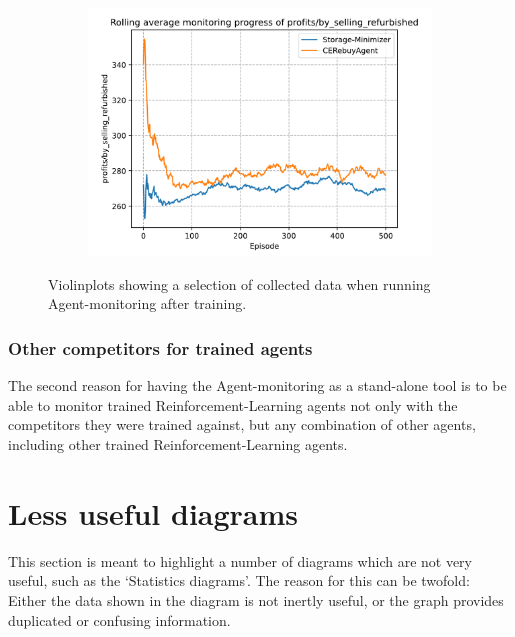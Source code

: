 \begin{figure}[t]
	\begin{subfigure}{0.33\textwidth}
		\centering
		\includegraphics[width = \textwidth]{images/experiments/rulebased/RuleBasedMonitoringProfitsRefurbished.pdf}\\
		\label{fig:RulebasedAgentMonitoring3}
	\end{subfigure}
	\caption{Violinplots showing a selection of collected data when running Agent-monitoring after training.}\label{fig:RulebasedAgentMonitoring}
\end{figure}

\subsubsection*{Other competitors for trained agents}

The second reason for having the Agent-monitoring as a stand-alone tool is to be able to monitor trained Reinforcement-Learning agents not only with the competitors they were trained against, but any combination of other agents, including other trained Reinforcement-Learning agents.

\section*{Less useful diagrams}\label{sec:UselessDiagrams}

This section is meant to highlight a number of diagrams which are not very useful, such as the `Statistics diagrams'. The reason for this can be twofold: Either the data shown in the diagram is not inertly useful, or the graph provides duplicated or confusing information.